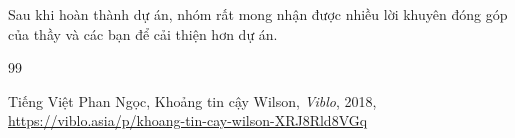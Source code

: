 \documentclass{uetgraduation}
\begin{document}
Sau khi hoàn thành dự án, nhóm rất mong nhận được nhiều lời khuyên đóng góp của thầy và các bạn để cải thiện hơn dự án.


\begin{thebibliography}{99}
    \begin{bibsection}{Tiếng Việt}
            Phan Ngọc, Khoảng tin cậy Wilson, \textit{Viblo}, 2018, \url{https://viblo.asia/p/khoang-tin-cay-wilson-XRJ8Rld8VGq}
    \end{bibsection}


\end{thebibliography}
\end{document}
